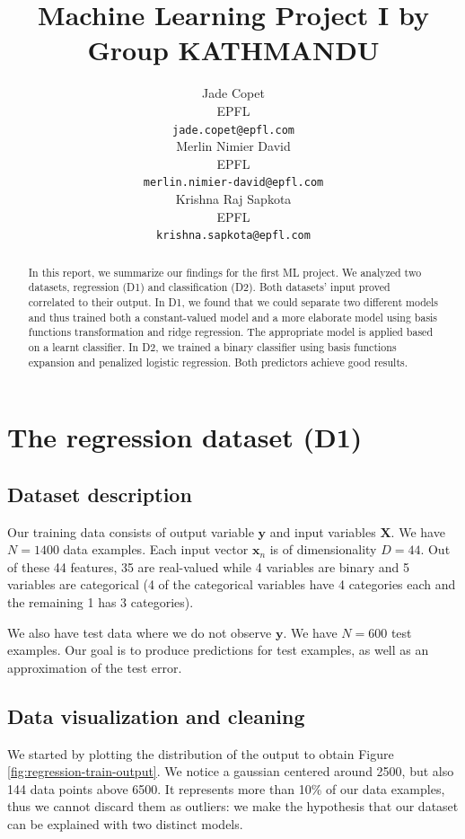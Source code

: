 \documentclass{article} %
\title{Machine Learning Project I by Group KATHMANDU}
\author{
  Jade Copet\\
  EPFL \\
  \texttt{jade.copet@epfl.com} \\
  \And
  Merlin Nimier David\\
  EPFL \\
  \texttt{merlin.nimier-david@epfl.com} \\
  \And
  Krishna Raj Sapkota\\
  EPFL \\
  \texttt{krishna.sapkota@epfl.com} \\
}
\begin{document}
\maketitle



\begin{abstract}
  In this report, we summarize our findings for the first ML project. We analyzed two datasets, regression (D1) and classification (D2). Both datasets' input proved correlated to their output. In D1, we found that we could separate two different models and thus trained both a constant-valued model and a more elaborate model using basis functions transformation and ridge regression. The appropriate model is applied based on a learnt classifier. In D2, we trained a binary classifier using basis functions expansion and penalized logistic regression. Both predictors achieve good results.
\end{abstract}



\section{The regression dataset (D1)}

  \subsection{Dataset description}
  Our training data consists of output variable $\mathbf{y}$ and input variables $\mathbf{X}$. We have $N = 1400$ data examples. Each input vector $\mathbf{x}_n$ is of dimensionality $D = 44$. Out of these 44 features, 35 are real-valued while 4 variables are binary and 5 variables are categorical (4 of the categorical variables have 4 categories each and the remaining 1 has 3 categories).

  We also have test data where we do not observe $\mathbf{y}$. We have $N = 600$ test examples. Our goal is to produce predictions for test examples, as well as an approximation of the test error.

  \subsection{Data visualization and cleaning}
  We started by plotting the distribution of the output to obtain Figure \ref{fig:regression-train-output}. We notice a gaussian centered around 2500, but also 144 data points above 6500. It represents more than 10\% of our data examples, thus we cannot discard them as outliers: we make the hypothesis that our dataset can be explained with two distinct models.
\end{document}
